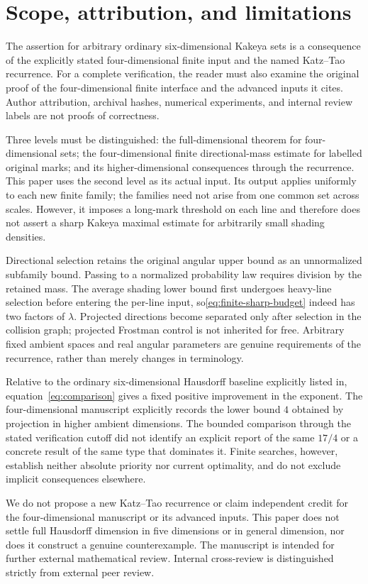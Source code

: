 \section{Scope, attribution, and limitations}\label{sec:scope}

The assertion for arbitrary ordinary six-dimensional Kakeya sets is a consequence of the explicitly stated four-dimensional finite input
and the named Katz--Tao recurrence.
For a complete verification, the reader must also examine the original proof of the four-dimensional finite interface and the advanced inputs it cites.
Author attribution, archival hashes, numerical experiments, and internal review labels are not proofs of correctness.

Three levels must be distinguished: the full-dimensional theorem for four-dimensional sets;
the four-dimensional finite directional-mass estimate for labelled original marks;
and its higher-dimensional consequences through the recurrence.
This paper uses the second level as its actual input.
Its output applies uniformly to each new finite family; the families need not arise from one common set across scales.
However, it imposes a long-mark threshold on each line and therefore does not assert a sharp Kakeya maximal estimate for arbitrarily small shading densities.

Directional selection retains the original angular upper bound as an unnormalized subfamily bound.
Passing to a normalized probability law requires division by the retained mass.
The average shading lower bound first undergoes heavy-line selection before entering the per-line input,
so\eqref{eq:finite-sharp-budget} indeed has two factors of $\lambda$.
Projected directions become separated only after selection in the collision graph;
projected Frostman control is not inherited for free.
Arbitrary fixed ambient spaces and real angular parameters are genuine requirements of the recurrence, rather than merely changes in terminology.

Relative to the ordinary six-dimensional Hausdorff baseline explicitly listed in\cite{KT,HRZ,GLX},
equation~\eqref{eq:comparison} gives a fixed positive improvement in the exponent.
The four-dimensional manuscript\cite[Section 11.2]{OAI4} explicitly records the lower bound $4$ obtained by projection in higher ambient dimensions.
The bounded comparison through the stated verification cutoff did not identify an explicit report of the same $17/4$
or a concrete result of the same type that dominates it.
Finite searches, however, establish neither absolute priority nor current optimality, and do not exclude implicit consequences elsewhere.

We do not propose a new Katz--Tao recurrence or claim independent credit for the four-dimensional manuscript or its advanced inputs.
This paper does not settle full Hausdorff dimension in five dimensions or in general dimension, nor does it construct a genuine counterexample.
The manuscript is intended for further external mathematical review.
Internal cross-review is distinguished strictly from external peer review.
